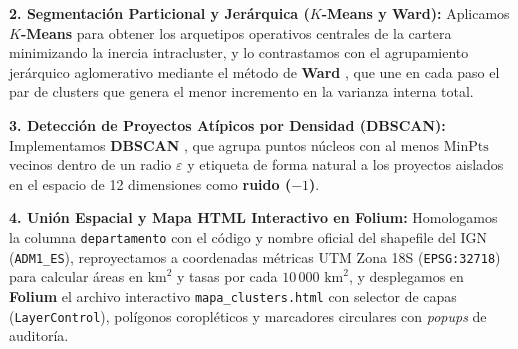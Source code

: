 \documentclass[conference]{IEEEtran}
\begin{document}
\textbf{2. Segmentaci\'on Particional y Jer\'arquica ($K$-Means y Ward):} Aplicamos \textbf{$K$-Means} \cite{macqueen1967} para obtener los arquetipos operativos centrales de la cartera minimizando la inercia intracluster, y lo contrastamos con el agrupamiento jer\'arquico aglomerativo mediante el m\'etodo de \textbf{Ward} \cite{ward1963}, que une en cada paso el par de clusters que genera el menor incremento en la varianza interna total.

\textbf{3. Detecci\'on de Proyectos At\'ipicos por Densidad (DBSCAN):} Implementamos \textbf{DBSCAN} \cite{ester1996}, que agrupa puntos n\'ucleos con al menos $\text{MinPts}$ vecinos dentro de un radio $\varepsilon$ y etiqueta de forma natural a los proyectos aislados en el espacio de 12 dimensiones como \textbf{ruido ($-1$)}.

\textbf{4. Uni\'on Espacial y Mapa HTML Interactivo en Folium:} Homologamos la columna \texttt{departamento} con el c\'odigo y nombre oficial del shapefile del IGN (\texttt{ADM1\_ES}), reproyectamos a coordenadas m\'etricas UTM Zona 18S (\texttt{EPSG:32718}) para calcular \'areas en $\text{km}^2$ y tasas por cada $10\,000\text{ km}^2$, y desplegamos en \textbf{Folium} el archivo interactivo \texttt{mapa\_clusters.html} con selector de capas (\texttt{LayerControl}), pol\'igonos coropl\'eticos y marcadores circulares con \textit{popups} de auditor\'ia.
\end{document}
